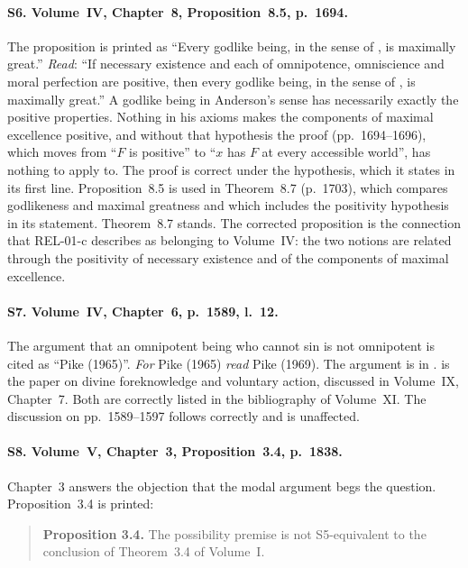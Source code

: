 \documentclass{situationist-preprint}
\begin{document}
\paragraph{S6. Volume~IV, Chapter~8, Proposition~8.5, p.~1694.} The proposition is printed as \enquote{Every godlike being, in the sense of \citet{Anderson1990}, is maximally great.} \textit{Read}: \enquote{If necessary existence and each of omnipotence, omniscience and moral perfection are positive, then every godlike being, in the sense of \citet{Anderson1990}, is maximally great.} A godlike being in Anderson's sense has necessarily exactly the positive properties. Nothing in his axioms makes the components of maximal excellence positive, and without that hypothesis the proof (pp.~1694--1696), which moves from \enquote{$F$ is positive} to \enquote{$x$ has $F$ at every accessible world}, has nothing to apply to. The proof is correct under the hypothesis, which it states in its first line. Proposition~8.5 is used in Theorem~8.7 (p.~1703), which compares godlikeness and maximal greatness and which includes the positivity hypothesis in its statement. Theorem~8.7 stands. The corrected proposition is the connection that REL-01-c describes as belonging to Volume~IV: the two notions are related through the positivity of necessary existence and of the components of maximal excellence.

\paragraph{S7. Volume~IV, Chapter~6, p.~1589, l.~12.} The argument that an omnipotent being who cannot sin is not omnipotent is cited as \enquote{Pike (1965)}. \textit{For} Pike (1965) \textit{read} Pike (1969). The argument is in \citet{Pike1969}. \citet{Pike1965} is the paper on divine foreknowledge and voluntary action, discussed in Volume~IX, Chapter~7. Both are correctly listed in the bibliography of Volume~XI. The discussion on pp.~1589--1597 follows \citet{Pike1969} correctly and is unaffected.

\paragraph{S8. Volume~V, Chapter~3, Proposition~3.4, p.~1838.} Chapter~3 answers the objection that the modal argument begs the question. Proposition~3.4 is printed:

\begin{quote}\small
\textbf{Proposition 3.4.} The possibility premise is not S5-equivalent to the conclusion of Theorem~3.4 of Volume~I.
\end{quote}
\end{document}
